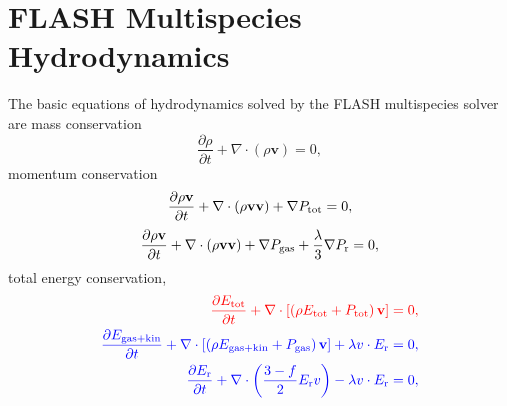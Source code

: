 \documentclass[preprint,11pt]{aastex}
\newcommand{\beq}{\begin{equation}}
\newcommand{\eeq}{\end{equation}}
\newcommand{\bea}{\begin{eqnarray}}
\newcommand{\eea}{\end{eqnarray}}
\begin{document}
\section{FLASH Multispecies Hydrodynamics}
\label{sec:hydro}
The basic equations of hydrodynamics solved by the FLASH multispecies solver are mass conservation
\beq 
\label{eq:e1}
\frac{\partial \rho}{\partial t} + \nabla \cdot (\rho \mathbf{v}) = 0, 
\eeq
momentum conservation
{\color{red}
\beq
\label{eq:e2}
\frac{\partial \rho\mathbf{v}}{\partial t} + \nabla \cdot (\rho\mathbf{v}\mathbf{v}) + \nabla P_{\rm tot} = 0,
\eeq
}
{\color{blue}
\beq
\label{eq:newmom}
\frac{\partial \rho\mathbf{v}}{\partial t} + \nabla \cdot (\rho\mathbf{v}\mathbf{v}) + \nabla P_{\rm gas} + \frac{\lambda}{3} \nabla P_{\rm r}= 0,
\eeq
}
total energy conservation,
\bea
{\color{red}
	\label{eq:e3}
	\frac{\partial E_{\rm tot}}{\partial t} + \nabla \cdot \left[ \left( \rho E_{\rm tot} + P_{\rm tot} \right) \mathbf{v} \right] = 0,
}\\
{\color{blue}
	\label{eq:e3}
	\frac{\partial E_{\rm gas+kin}}{\partial t} + \nabla \cdot \left[ \left( \rho E_{\rm gas+kin} + P_{\rm gas} \right) \mathbf{v} \right] + \lambda v \cdot E_{\rm r} = 0,
}\\
{\color{blue}
	\frac{\partial E_{\rm r}}{\partial t} + \nabla \cdot \left( \frac{3-f}{2} E_{\rm r} v \right)- \lambda v \cdot E_{\rm r} = 0,
}
\eea
\end{document}
